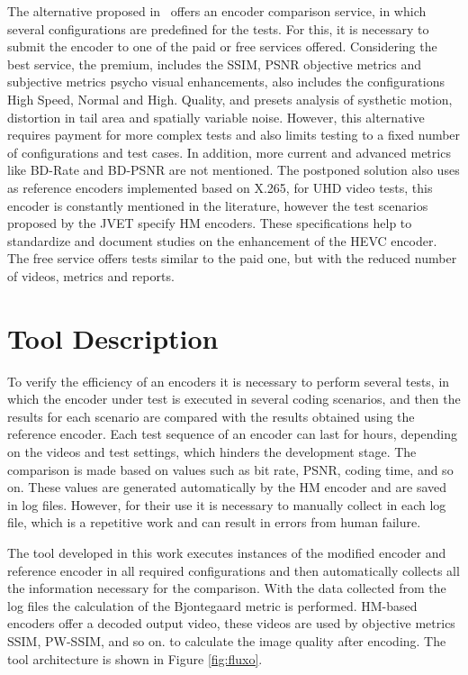 \documentclass[journal]{IEEEtran}
\begin{document}
The alternative proposed in~\cite{msu:16} offers an encoder comparison service, in which several configurations are predefined for the tests. For this, it is necessary to submit the encoder to one of the paid or free services offered. Considering the best service, the premium, includes the SSIM, PSNR objective metrics and subjective metrics psycho visual enhancements, also includes the configurations High Speed, Normal and High. Quality, and presets analysis of systhetic motion, distortion in tail area and spatially variable noise. However, this alternative requires payment for more complex tests and also limits testing to a fixed number of configurations and test cases. In addition, more current and advanced metrics like BD-Rate and BD-PSNR are not mentioned. The postponed solution also uses as reference encoders implemented based on X.265, for UHD video tests, this encoder is constantly mentioned in the literature, however the test scenarios proposed by the JVET specify HM encoders. These specifications help to standardize and document studies on the enhancement of the HEVC encoder. The free service offers tests similar to the paid one, but with the reduced number of videos, metrics and reports.



\section{Tool Description}

To verify the efficiency of an encoders it is necessary to perform several tests, in which the encoder under test is executed in several coding scenarios, and then the results for each scenario are compared with the results obtained using the reference encoder. Each test sequence of an encoder can last for hours, depending on the videos and test settings, which hinders the development stage. The comparison is made based on values such as bit rate, PSNR, coding time, and so on. These values are generated automatically by the HM encoder and are saved in log files. However, for their use it is necessary to manually collect in each log file, which is a repetitive work and can result in errors from human failure. 

The tool developed in this work executes instances of the modified encoder and reference encoder in all required configurations and then automatically collects all the information necessary for the comparison. With the data collected from the log files the calculation of the Bjontegaard \cite{Bjontegaard} metric is performed. HM-based encoders offer a decoded output video, these videos are used by objective metrics SSIM, PW-SSIM, and so on. to calculate the image quality after encoding. The tool architecture is shown in Figure \ref{fig:fluxo}. 
\end{document}
